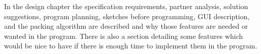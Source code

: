 In the design chapter the specification requirements, partner analysis, solution suggestions, program planning, sketches before programming, GUI description, and the packing algorithm are described and why those features are needed or wanted in the program. There is also a section detailing some features which would be nice to have if there is enough time to implement them in the program.